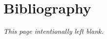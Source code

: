   \frenchspacing

  \begin{multicols}{2}
    
    
    
    
    
    
    
    
    

    \end{multicols}
    \chapter*{Bibliography}
    \vspace{-3ex}
    \begin{multicols}{2}
    \renewcommand{\chapter}[2]{}
    {}
  \end{multicols}

  
  
  
  

  \newpage
  \vspace*{\fill}
  \hfill
  \begin{center}
    \Large\textit{This page intentionally left blank.}
  \end{center}
  \vspace{\fill}
  \thispagestyle{empty}
  \newpage

  

